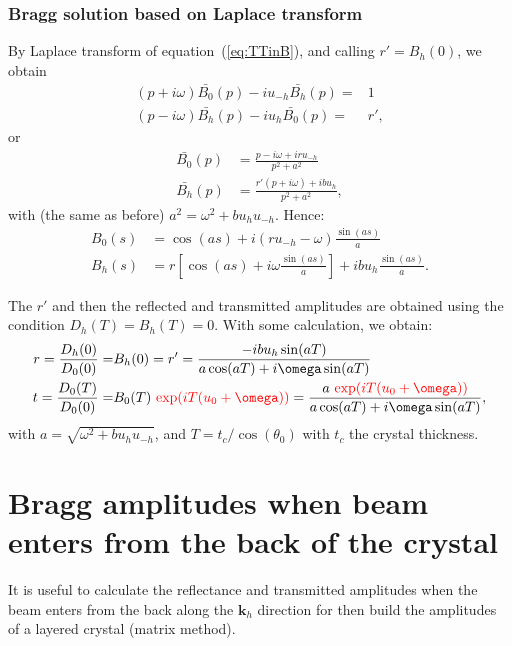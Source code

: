 \documentclass{iucr}
\newcommand{\inred}[1]{{\color{red}#1}}
\begin{document}
\subsubsection{Bragg solution based on Laplace transform}By Laplace transform of equation~(\ref{eq:TTinB}), and calling \inred{$r'=B_h(0)$}, we obtain
\begin{subequations}
\label{eq:TTbraggLaplace}
\begin{align}
(p + i \omega) \bar{B_0}(p) - i u_{-h} \bar{B_h}(p)= & 1 \\
(p - i \omega) \bar{B_h}(p) - i u_{h} \bar{B_0}(p)= & r',
\end{align}
\end{subequations}
or 
\begin{subequations}
\begin{align}
\bar{B_0}(p) &= \frac{p - i \omega + i r u_{-h}}{p^2 + a^2} \\
\bar{B_h}(p) &= \frac{r' (p + i \omega) + i b u_h}{p^2 + a^2},
\end{align}
\end{subequations}
with \inred{(the same as before)} $a^2=\omega^2+b u_h u_{-h}$. Hence:
\begin{subequations}
\begin{align}
B_0(s) &= \cos(a s) + i (r u_{-h} - \omega) \frac{\sin(a s)}{a}\\
B_h(s) &= r [\cos(a s) + i \omega \frac{\sin(a s)}{a}] + i b u_h \frac{\sin(a s)}{a}.
\end{align}
\end{subequations}

The $r'$ and then the reflected and transmitted amplitudes are obtained using the condition $D_h(T)=B_h(T)=0$. With some calculation, we obtain: 
\begin{subequations}
\begin{align}
r=\frac{D_h(0)}{D_0(0)} =& B_h(0) = r' = \frac{-i b u_h \sin(a T)}{a \cos(a T) + i\omega \sin(a T)}\\
t =\frac{D_0(T)}{D_0(0)}= & B_0(T) ~ \inred{\exp(i T (u_0+\omega))} = \frac{a~\inred{\exp(i T (u_0+\omega))}}{a \cos(a T) + i\omega \sin(a T)} ,
\end{align}
\end{subequations}
with $a=\sqrt{\omega^2 + b u_h u_{-h}}$, and  
\inred{$T=t_c/\cos(\theta_0)$ with $t_c$ the crystal thickness. }


\section{Bragg amplitudes when beam enters from the back of the crystal}
\label{sec:braggfromtheback}
It is useful to calculate the reflectance and transmitted amplitudes when the beam enters from the back along the $\textbf{k}_h$ direction for then build the amplitudes of a layered crystal (matrix method). 
\end{document}
